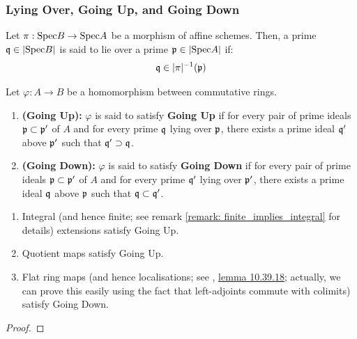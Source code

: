             \subsubsection{Lying Over, Going Up, and Going Down}
                \begin{definition}
                    Let $\pi: \mathrm{Spec} B \to \mathrm{Spec} A$ be a morphism of affine schemes. Then, a prime $\mathfrak{q} \in |\mathrm{Spec} B|$ is said to lie over a prime $\mathfrak{p} \in |\mathrm{Spec} A|$ if:
                        $$\mathfrak{q} \in |\pi|^{-1}(\mathfrak{p})$$
                \end{definition}
            
                \begin{definition}
                    Let $\varphi: A \to B$ be a homomorphism between commutative rings.
                        \begin{enumerate}
                            \item \textbf{(Going Up):} $\varphi$ is said to satisfy \textbf{Going Up} if for every pair of prime ideals $\mathfrak{p} \subset \mathfrak{p}'$ of $A$ and for every prime $\mathfrak{q}$ lying over $\mathfrak{p}$, there exists a prime ideal $\mathfrak{q}'$ above $\mathfrak{p}'$ such that $\mathfrak{q}' \supset \mathfrak{q}$.  
                            \item \textbf{(Going Down):} $\varphi$ is said to satisfy \textbf{Going Down} if for every pair of prime ideals $\mathfrak{p} \subset \mathfrak{p}'$ of $A$ and for every prime $\mathfrak{q}'$ lying over $\mathfrak{p}'$, there exists a prime ideal $\mathfrak{q}$ above $\mathfrak{p}$ such that $\mathfrak{q} \subset \mathfrak{q}'$. 
                        \end{enumerate}
                \end{definition}
                
                \begin{proposition} \label{prop: going_up_and_down_criteria}
                    \noindent
                    \begin{enumerate}
                        \item Integral (and hence finite; see remark \ref{remark: finite_implies_integral} for details) extensions satisfy Going Up.
                        \item Quotient maps satisfy Going Up.
                        \item Flat ring maps (and hence localisations; see \cite{stacks}, \href{https://stacks.math.columbia.edu/tag/00HT}{\underline{lemma 10.39.18}}; actually, we can prove this easily using the fact that left-adjoints commute with colimits) satisfy Going Down. 
                    \end{enumerate}
                \end{proposition}
                    \begin{proof}
                         
                    \end{proof}
                
